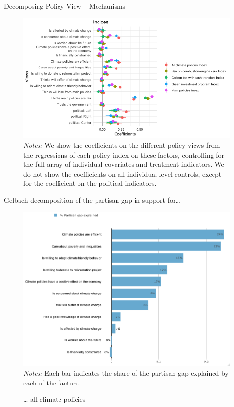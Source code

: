 \begin{frame}{Decomposing Policy View -- Mechanisms}%
\begin{figure}[h!]
\includegraphics[width=.9\textwidth]{../../figures/Gelbach/coef_policy_views_indices_all} \\
{\tiny \textit{Notes:} We show the coefficients on the different policy views from the regressions of each policy index on these factors, controlling for the full array of individual covariates and treatment indicators. We do not show the coefficients on all individual-level controls, except for the coefficient on the political indicators.}
\end{figure}
\end{frame}

\begin{frame}{Gelbach decomposition of the partisan gap in support for…}%
\vspace{-.2cm}
\begin{figure}[h!]
\caption{… all climate policies}
\includegraphics[width=.75\textwidth]{../../figures/Gelbach/gelbach_right_all_policies_D2SD} \\
{\tiny \textit{Notes:} Each bar indicates the share of the partisan gap explained by each of the factors.}
\end{figure}
\end{frame}

